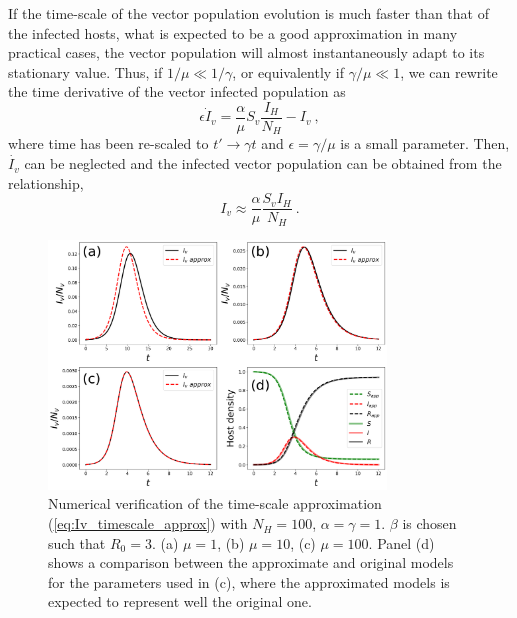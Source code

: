 If the time-scale of the vector population evolution is much faster than
that of the infected hosts, what is expected to be a good approximation in many
practical cases, the vector population will almost instantaneously adapt to its
stationary value. Thus, if $1/\mu\ll1/\gamma$, or equivalently if
$\gamma/\mu\ll1$, we can rewrite the time derivative of the vector infected
population as
\begin{equation}
    \epsilon\dot{I}_v=\frac{\alpha}{\mu}S_v\frac{I_H}{N_H} - I_v \ ,
\end{equation}
where time has been re-scaled to $t'\to\gamma t$ and $\epsilon=\gamma/\mu$
is a small parameter. Then, $\dot{I_v}$ can be neglected and the infected
vector population can be obtained from the relationship,
\begin{equation}\label{eq:Iv_timescale_approx}
    I_v\approx\frac{\alpha}{\mu}\frac{S_v I_H}{N_H} \ .
\end{equation}

\begin{figure}[H]
    \centering
    \includegraphics[width=0.8\textwidth]{Figures/Timescale_approx.pdf}
    \caption{Numerical verification of the time-scale approximation
        (\cref{eq:Iv_timescale_approx}) with $N_H=100$, $\alpha=\gamma=1$.
        $\beta$ is
        chosen such that $R_0=3$. (a) $\mu=1$, (b) $\mu=10$, (c) $\mu=100$.
        Panel (d)
        shows a comparison between the approximate and original models for the
        parameters used in (c), where the approximated models is expected to
        represent
        well the original one.}
    \label{fig:timescale_approx}
\end{figure}

